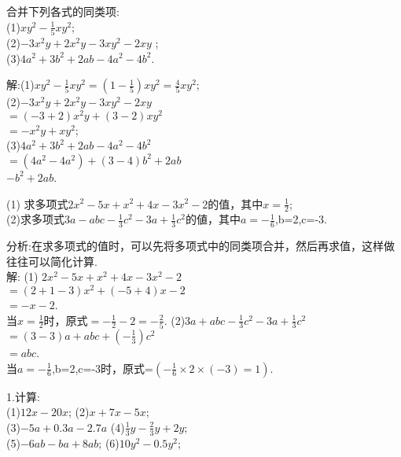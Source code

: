 \documentclass[UTF8]{report}
\theoremstyle{definition}
\theoremstyle{remark}
\begin{document}
\begin{exercise}合并下列各式的同类项:
 \\(1)$xy^{2}-\frac{1}{5}xy^{2}$;
 \\(2)$-3x^{2}y+2x^{2}y-3xy^{2}-2xy$ ;
 \\(3)$4a^{2}+3b^{2}+2ab-4a^{2}-4b^{2}$.
 \end{exercise}
 \begin{Answer}
 解:(1)$xy^{2}-\frac{1}{5}xy^{2}=(1-\frac{1}{5})xy^{2}=\frac{4}{5}xy^{2}$;
 \\(2)$-3x^{2}y+2x^{2}y-3xy^{2}-2xy$
 \\$=(-3+2)x^{2}y+(3-2)xy^{2}$
 \\$=-x^{2}y+xy^{2}$;
 \\(3)$4a^{2}+3b^{2}+2ab-4a^{2}-4b^{2}$
 \\$=(4a^{2}-4a^{2})+(3-4)b^{2}+2ab$
 \\$-b^{2}+2ab$.
 \end{Answer}

\begin{exercise}
(1) 求多项式$2x^{2}-5x+x^{2}+4x-3x^{2}-2$的值，其中$x=\frac{1}{2}$;
 \\(2)求多项式$3a-abc-\frac{1}{3}c^{2}-3a+\frac{1}{3}c^{2}$的値，其中$a=-\frac{1}{6}$,b=2,c=-3.
\end{exercise}
 \begin{Answer}
分析:在求多项式的值时，可以先将多项式中的同类项合并，然后再求值，这样做往往可以简化计算.
\\ 解: (1) $2x^{2}-5x+x^{2}+4x-3x^{2}-2$
      \\$=(2+1-3)x^{2}+(-5+4)x-2$
      \\$=-x-2$.
\\ 当$x=\frac{1}{2}$时，原式$=-\frac{1}{2}-2=-\frac{2}{5}$.
(2)$3a+abc-\frac{1}{3}c^{2}-3a+\frac{1}{3}c^{2}$
\\$=(3-3)a+abc+(-\frac{1}{3})c^{2}$
\\$=abc$.
\\ 当$a=-\frac{1}{6}$,b=2,c=-3时，原式=$(-\frac{1}{6}\times2\times(-3)=1)$.
\end{Answer}

\begin{exercise}
1.计算:
      \\(1)$12x-20x$;  (2)$x+7x-5x$;
      \\(3)$-5a+0.3a-2.7a$  (4)$\frac{1}{3}y-\frac{2}{3}y+2y$;
      \\(5)$-6ab-ba+8ab$;  (6)$10y^{2}-0.5y^{2}$;
\end{exercise}
\end{document}
